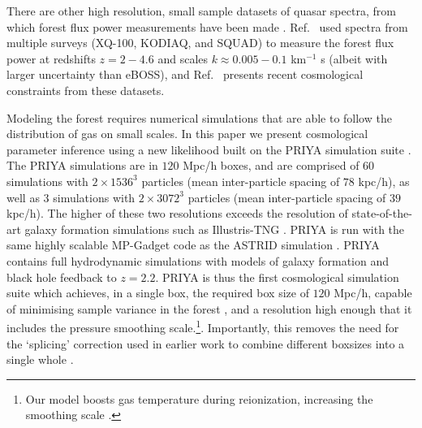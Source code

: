 There are other high resolution, small sample datasets of quasar spectra, from which \lya forest flux power measurements have been made \cite{2017MNRAS.466.4332I, 2019MNRAS.489.2536D, 2022MNRAS.509.2842K, 2022MNRAS.515..857E}. Ref.~\cite{2022MNRAS.509.2842K} used spectra from multiple surveys (XQ-100, KODIAQ, and SQUAD) to measure the \lya forest flux power at redshifts $z=2-4.6$ and scales $k\approx0.005-0.1$ km$^{-1}$ s (albeit with larger uncertainty than eBOSS), and Ref.~\cite{2022MNRAS.515..857E} presents recent cosmological constraints from these datasets.

Modeling the \lya forest requires numerical simulations that are able to follow the distribution of gas on small scales.
In this paper we present cosmological parameter inference using a new likelihood built on the PRIYA simulation suite \cite{2023simsuite}.
The PRIYA simulations are in $120$ Mpc/h boxes, and are comprised of \textbf{$60$} simulations with $2\times 1536^3$ particles (mean inter-particle spacing of $78$ kpc/h), as well as $3$ simulations with $2\times 3072^3$ particles (mean inter-particle spacing of $39$ kpc/h).
The higher of these two resolutions exceeds the resolution of state-of-the-art galaxy formation simulations such as Illustris-TNG \cite{2018MNRAS.475..676S}.
PRIYA is run with the same highly scalable MP-Gadget code as the ASTRID simulation \cite{2022MNRAS.512.3703B,2022MNRAS.513..670N}.
PRIYA contains full hydrodynamic simulations with models of galaxy formation and black hole feedback to $z=2.2$.
PRIYA is thus the first cosmological simulation suite which achieves, in a single box, the required box size of $120$ Mpc/h, capable of minimising sample variance in the \lya forest \cite{2014JCAP...07..005B}, and a resolution high enough that it includes the pressure smoothing scale.\footnote{Our model boosts gas temperature during reionization, increasing the smoothing scale \cite{2023simsuite}.}.
Importantly, this removes the need for the `splicing' correction used in earlier work to combine different boxsizes into a single whole \cite{2014JCAP...07..005B,2020JCAP...04..038P}.

